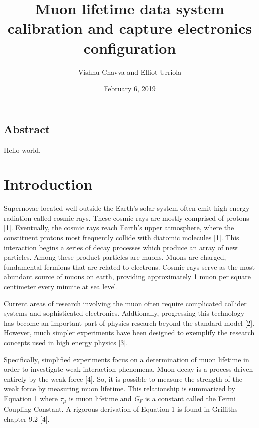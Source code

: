 \documentclass{article}
\title{Muon lifetime data system calibration and capture electronics configuration}
\author{Vishnu Chavva and Elliot Urriola }
\date{February 6, 2019}
\begin{document}
\maketitle

\begin{center}
    
    \section*{Abstract}
    Hello world.  
\end{center}

\section*{Introduction}

\hspace{3.5mm} Supernovae located well outside the Earth's solar system often emit high-energy radiation called cosmic rays. These cosmic rays are mostly comprised of protons [1]. %
Eventually, the cosmic rays reach Earth's  upper atmosphere, where the constituent protons most frequently collide with diatomic molecules [1]. %
This interaction begins a series of decay processes which produce an array of new particles. Among these product particles are muons. Muons are charged, fundamental fermions that are related to electrons. Cosmic rays serve as the most abundant source of muons on earth, providing approximately 1 muon per square centimeter every minuite at sea level.   

Current areas of research involving the muon often require complicated collider systems and sophisticated electronics. Addtionally, progressing this technology has become an important part of physics research beyond the standard model [2]. %
However, much simpler experiments have been designed to exemplify the research concepts used in high energy physics [3]. %



Specifically, simplified experiments focus on a determination of muon lifetime in order to investigate weak interaction phenomena. Muon decay is a process driven entirely by the weak force [4]. %
So, it is possible to measure the strength of the weak force by measuring muon lifetime. This relationship is summarized by Equation 1 where $\tau_{\mu}$ is muon lifetime and \textit{G$_{F}$} is a constant called the Fermi Coupling Constant. A rigorous derivation of Equation 1 is found in Griffiths chapter 9.2 [4]. %
\end{document}
